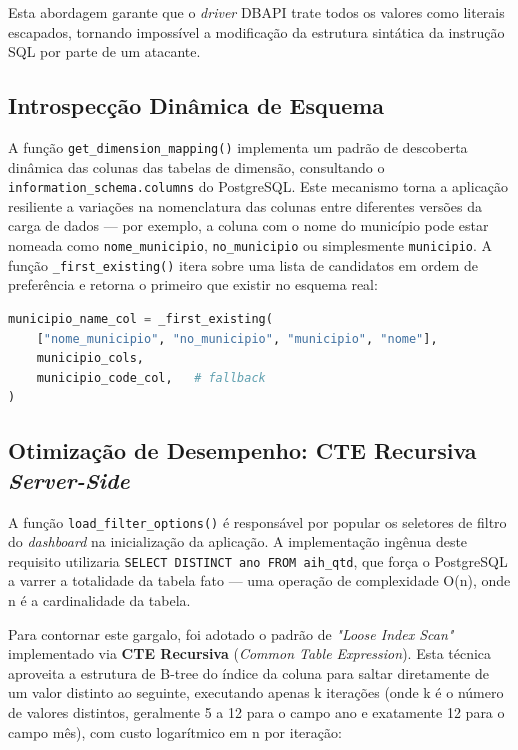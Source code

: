 \documentclass[12pt,a4paper]{report}
\begin{document}
Esta abordagem garante que o \textit{driver} DBAPI trate todos os valores como literais
escapados, tornando impossível a modificação da estrutura sintática da instrução SQL
por parte de um atacante.

\subsection{Introspecção Dinâmica de Esquema}

A função \texttt{get\_dimension\_mapping()} implementa um padrão de descoberta dinâmica
das colunas das tabelas de dimensão, consultando o \texttt{information\_schema.columns}
do PostgreSQL. Este mecanismo torna a aplicação resiliente a variações na nomenclatura
das colunas entre diferentes versões da carga de dados — por exemplo, a coluna com o
nome do município pode estar nomeada como \texttt{nome\_municipio}, \texttt{no\_municipio}
ou simplesmente \texttt{municipio}. A função \texttt{\_first\_existing()} itera sobre
uma lista de candidatos em ordem de preferência e retorna o primeiro que existir no
esquema real:

\begin{lstlisting}[language=Python]
municipio_name_col = _first_existing(
    ["nome_municipio", "no_municipio", "municipio", "nome"],
    municipio_cols,
    municipio_code_col,   # fallback
)
\end{lstlisting}

\subsection{Otimização de Desempenho: CTE Recursiva \textit{Server-Side}}

A função \texttt{load\_filter\_options()} é responsável por popular os seletores de
filtro do \textit{dashboard} na inicialização da aplicação. A implementação ingênua
deste requisito utilizaria \texttt{SELECT DISTINCT ano FROM aih\_qtd}, que força o
PostgreSQL a varrer a totalidade da tabela fato — uma operação de complexidade O(n),
onde n é a cardinalidade da tabela.

Para contornar este gargalo, foi adotado o padrão de \textit{"Loose Index Scan"}
implementado via \textbf{CTE Recursiva} (\textit{Common Table Expression}). Esta
técnica aproveita a estrutura de B-tree do índice da coluna para saltar diretamente de
um valor distinto ao seguinte, executando apenas k iterações (onde k é o número de
valores distintos, geralmente 5 a 12 para o campo ano e exatamente 12 para o campo
mês), com custo logarítmico em n por iteração:
\end{document}
